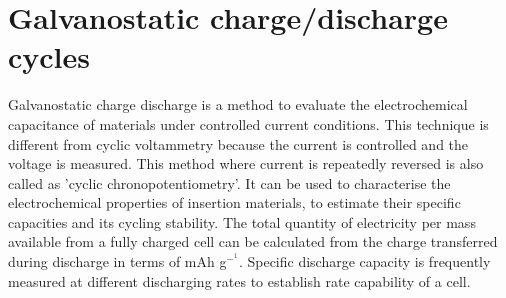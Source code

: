 \section{Galvanostatic charge/discharge cycles}
Galvanostatic  charge  discharge  is  a  method  to  evaluate  the  electrochemical capacitance of materials under controlled current conditions. This technique is different from cyclic  voltammetry  because the current is controlled and the voltage is  measured. This  method  where current is repeatedly reversed is  also  called  as  'cyclic chronopotentiometry'. It can be used to characterise the electrochemical properties of insertion materials, to estimate their specific capacities and its cycling stability. The total quantity of electricity per mass available from a fully charged cell can be calculated from the charge transferred during discharge in terms of mAh g$^-^1$. Specific discharge capacity is frequently measured at different discharging rates to establish rate capability of a cell. 


